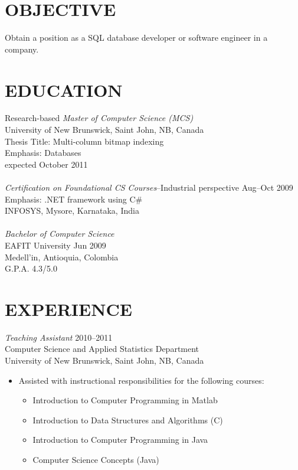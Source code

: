 \documentclass[line,margin]{res}
\begin{document}
\address{19603 Fernhaven, Katy, TX 77449}
\address{(281) 398-9692}

 
\begin{resume}

\section{OBJECTIVE} %
\label{sec:objective}
    Obtain a position as a SQL database developer or software engineer in a company. 

\section{EDUCATION} %
\label{sec:education}
    Research-based {\sl Master of Computer Science (MCS)} \\
    University of New Brunswick, Saint John, NB, Canada\\
    Thesis Title: Multi-column bitmap indexing\\
    Emphasis: Databases\\
    expected October 2011 \\\\
    {\sl Certification on Foundational CS Courses}--Industrial perspective \hfill Aug--Oct 2009\\
    Emphasis: .NET framework using C\#\\
    INFOSYS, Mysore, Karnataka, India\\\\
    {\sl Bachelor of Computer Science}\\
    EAFIT University \hfill Jun 2009\\
    Medell\a'in, Antioquia, Colombia\\
    G.P.A. 4.3/5.0\\

\section{EXPERIENCE} %
\label{sec:experience}

{\sl Teaching Assistant} \hfill 2010--2011\\
Computer Science and Applied Statistics Department\\
University of New Brunswick, Saint John, NB, Canada
\begin{itemize} %
    \item Assisted with instructional responsibilities for the following courses:
    \begin{itemize} \itemsep -2pt
        \item Introduction to Computer Programming in Matlab
        \item Introduction to Data Structures and Algorithms (C)
        \item Introduction to Computer Programming in Java
        \item Computer Science Concepts (Java)
    \end{itemize}
\end{itemize}


\end{resume}
\end{document}
